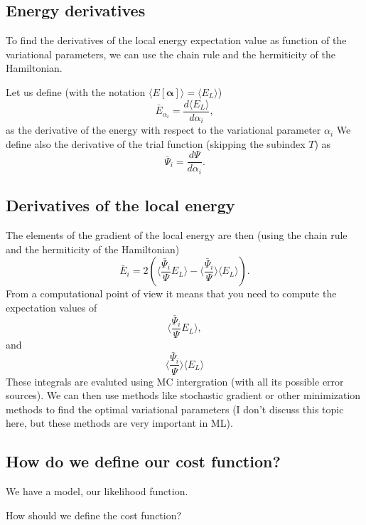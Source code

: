 \documentclass[%
oneside,                 %
final,                   %
10pt]{article}
\begin{document}
\subsection{Energy derivatives}
\begin{block}{}
To find the derivatives of the local energy expectation value as function of the variational parameters, we can use the chain rule and the hermiticity of the Hamiltonian.  

Let us define (with the notation $\langle E[\bm{\alpha}]\rangle =\langle  E_L\rangle$)
\[
\bar{E}_{\alpha_i}=\frac{d\langle  E_L\rangle}{d\alpha_i},
\]
as the derivative of the energy with respect to the variational parameter $\alpha_i$
We define also the derivative of the trial function (skipping the subindex $T$) as 
\[
\bar{\Psi}_{i}=\frac{d\Psi}{d\alpha_i}.
\]
\end{block}

\subsection{Derivatives of the local energy}
\begin{block}{}
The elements of the gradient of the local energy are then (using the chain rule and the hermiticity of the Hamiltonian)
\[
\bar{E}_{i}= 2\left( \langle \frac{\bar{\Psi}_{i}}{\Psi}E_L\rangle -\langle \frac{\bar{\Psi}_{i}}{\Psi}\rangle\langle E_L \rangle\right).
\]
From a computational point of view it means that you need to compute the expectation values of 
\[
\langle \frac{\bar{\Psi}_{i}}{\Psi}E_L\rangle,
\]
and
\[
\langle \frac{\bar{\Psi}_{i}}{\Psi}\rangle\langle E_L\rangle
\]
These integrals are evaluted using MC intergration (with all its possible error sources). 
We can then use methods like stochastic gradient or other minimization methods to find the optimal variational parameters (I don't discuss this topic here, but these methods are very important in ML). 
\end{block}

\subsection{How do we define our cost function?}
\begin{block}{}
We have a model, our likelihood function. 

How should we define the cost function?

\end{block}
\end{document}
